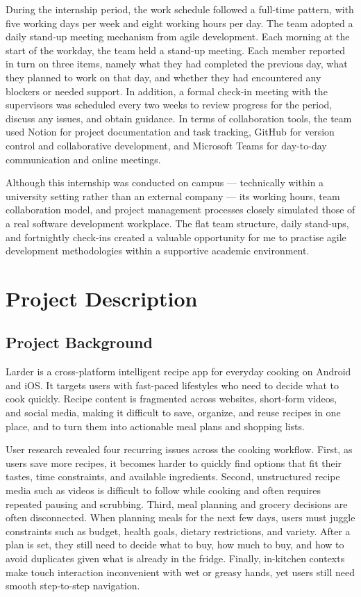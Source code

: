 \documentclass[sigconf]{acmart}
\begin{document}
During the internship period, the work schedule followed a full-time pattern, with five working days per week and eight working hours per day. The team adopted a daily stand-up meeting mechanism from agile development. Each morning at the start of the workday, the team held a stand-up meeting. Each member reported in turn on three items, namely what they had completed the previous day, what they planned to work on that day, and whether they had encountered any blockers or needed support. In addition, a formal check-in meeting with the supervisors was scheduled every two weeks to review progress for the period, discuss any issues, and obtain guidance. In terms of collaboration tools, the team used Notion for project documentation and task tracking, GitHub for version control and collaborative development, and Microsoft Teams for day-to-day communication and online meetings.

Although this internship was conducted on campus --- technically within a university setting rather than an external company --- its working hours, team collaboration model, and project management processes closely simulated those of a real software development workplace. The flat team structure, daily stand-ups, and fortnightly check-ins created a valuable opportunity for me to practise agile development methodologies within a supportive academic environment.

\section{Project Description}

\subsection{Project Background}

Larder is a cross-platform intelligent recipe app for everyday cooking on Android and iOS. It targets users with fast-paced lifestyles who need to decide what to cook quickly. Recipe content is fragmented across websites, short-form videos, and social media, making it difficult to save, organize, and reuse recipes in one place, and to turn them into actionable meal plans and shopping lists.

User research revealed four recurring issues across the cooking workflow. First, as users save more recipes, it becomes harder to quickly find options that fit their tastes, time constraints, and available ingredients. Second, unstructured recipe media such as videos is difficult to follow while cooking and often requires repeated pausing and scrubbing. Third, meal planning and grocery decisions are often disconnected. When planning meals for the next few days, users must juggle constraints such as budget, health goals, dietary restrictions, and variety. After a plan is set, they still need to decide what to buy, how much to buy, and how to avoid duplicates given what is already in the fridge. Finally, in-kitchen contexts make touch interaction inconvenient with wet or greasy hands, yet users still need smooth step-to-step navigation.
\end{document}
